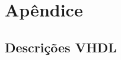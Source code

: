 \documentclass[a4,12pt]{horizon-theme}
\newenvironment{code}{\captionsetup{type=listing}}{}
\begin{document}
\newpage
\appendix
\section*{Apêndice}
\renewcommand{\thesubsection}{\Alph{subsection}}

\subsection{Descrições VHDL}
\label{ap:vhdl}


\begin{code}
\label{lst:uc}
\vspace{-12pt}
\inputminted[frame=lines, framesep=6pt, framerule=0.5pt, linenos, rulecolor=secondaryColor, breaklines]{VHDL}{unidade_controle.vhd}
\end{code}


% 
% 

\horizonBackCover
\end{document}
